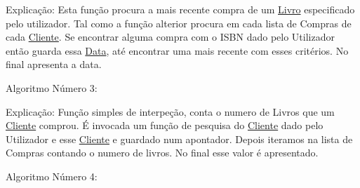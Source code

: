 \begin{DoxyEnumerate}
\begin{DoxyCode}{0}
\DoxyCodeLine{            \}}
\DoxyCodeLine{        \} }
\DoxyCodeLine{    \}}
\DoxyCodeLine{}
\DoxyCodeLine{    \}      }
\DoxyCodeLine{\}}
\end{DoxyCode}
 Explicação\+: Esta função procura a mais recente compra de um \mbox{\hyperlink{structLivro}{Livro}} especificado pelo utilizador. Tal como a função alterior procura em cada lista de Compras de cada \mbox{\hyperlink{structCliente}{Cliente}}. Se encontrar alguma compra com o I\+S\+BN dado pelo Utilizador então guarda essa \mbox{\hyperlink{structData}{Data}}, até encontrar uma mais recente com esses critérios. No final apresenta a data.
\item Algoritmo Número 3\+: 
\begin{DoxyCode}{0}
\DoxyCodeLine{}
\DoxyCodeLine{    \}}
\DoxyCodeLine{}
\DoxyCodeLine{}
\DoxyCodeLine{    \}}
\DoxyCodeLine{}
\DoxyCodeLine{}
\DoxyCodeLine{\}}
\end{DoxyCode}
 Explicação\+: Função simples de interpeção, conta o numero de Livros que um \mbox{\hyperlink{structCliente}{Cliente}} comprou. É invocada um função de pesquisa do \mbox{\hyperlink{structCliente}{Cliente}} dado pelo Utilizador e esse \mbox{\hyperlink{structCliente}{Cliente}} e guardado num apontador. Depois iteramos na lista de Compras contando o numero de livros. No final esse valor é apresentado.
\item Algoritmo Número 4\+: 
\begin{DoxyCode}{0}

\end{DoxyCode}
\end{DoxyEnumerate}
